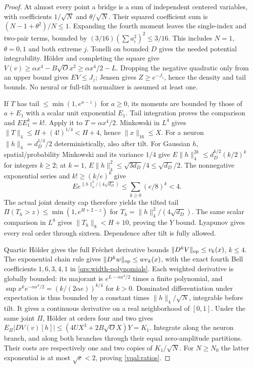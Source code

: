 \documentclass[11pt]{article}
\theoremstyle{plain}
\theoremstyle{definition}
\theoremstyle{remark}
\begin{document}
\begin{proof}
At almost every point a bridge is a sum of independent centered
variables, with coefficients $1/\sqrt N$ and $\theta/\sqrt N$.
Their squared coefficient sum is $(N-1+\theta^2)/N\le1$.
Expanding the fourth moment leaves the single-index and two-pair terms,
bounded by $(3/16)(\sum a_i^2)^2\le3/16$. This includes $N=1$,
$\theta=0,1$ and both extreme $j$. Tonelli on bounded $D$ gives the
needed potential integrability. H\"older and completing the square give
$V(v)\ge\alpha x^4-B\sqrt O x^2\ge\alpha x^4/2-L$.
Dropping the negative quadratic only from an upper bound gives
$EV\le J_z$; Jensen gives $Z\ge e^{-J_z}$, hence the density and tail
bounds. No neural or full-tilt normalizer is assumed at least one.

If $T$ has tail $\le\min(1,e^{a-z})$ for $a\ge0$, its moments are
bounded by those of $a+E_1$ with a scalar unit exponential $E_1$.
Tail integration proves the comparison and $EE_1^k=k!$.
Apply it to $T=\alpha x^4/2$. Minkowski in $L^4$ gives
$\|T\|_4\le H+(4!)^{1/4}<H+4$, hence $\|x\|_{16}\le X$.
For a neuron $\|h\|_4=d_D^{1/4}/2$ deterministically, also after tilt.
For Gaussian $h$, spatial/probability Minkowski and its variance $1/4$
give $E\|h\|_4^{2k}\le d_D^{k/2}(k/2)^k$ for integers $k\ge2$;
at $k=1$, $E\|h\|_4^2\le\sqrt{3d_D}/4\le\sqrt{d_D}/2$.
The nonnegative exponential series and $k!\ge(k/e)^k$ give
\begin{equation}\label{vqal:gaussianexp}
 E e^{\|h\|_4^2/(4\sqrt{d_D})}
 \le\sum_{k\ge0}(e/8)^k<4.
\end{equation}
The actual joint density cap therefore yields the tilted tail
$\Pi(T_h>z)\le\min(1,e^{H+2-z})$ for
$T_h=\|h\|_4^2/(4\sqrt{d_D})$.
The same scalar comparison in $L^8$ gives
$\|T_h\|_8<H+10$, proving the $Y$ bound. Lyapunov gives every real
order through sixteen. Dependence after tilt is fully allowed.

Quartic H\"older gives the full Fr\'echet derivative bounds
$\|D^kV\|_{\rm op}\le v_k(x)$, $k\le4$.
The exponential chain rule gives $\|D^kw\|_{\rm op}\le w e_k(x)$,
with the exact fourth Bell coefficients $1,6,3,4,1$ in
\eqref{qrs:width-polynomials}. Each weighted derivative is globally
bounded: its majorant is $e^{L-\alpha x^4/2}$ times a finite polynomial,
and $\sup x^ke^{-\alpha x^4/2}=(k/(2\alpha e))^{k/4}$ for $k>0$.
Dominated differentiation under expectation is thus bounded by a
constant times $\|h\|_4/\sqrt N$, integrable before tilt.
It gives a continuous derivative on a real neighborhood of $[0,1]$.
Under the same joint $\Pi$, H\"older at orders four and two gives
$E_\Pi|DV(v)[h]|\le(4UX^3+2B\sqrt O X)Y=K_1$.
Integrate along the neuron branch, and along both branches through their
equal zero-amplitude partitions. Their costs are respectively one and
two copies of $K_1/\sqrt N$. For $N\ge N_0$ the latter exponential is
at most $\sqrt e<2$, proving \eqref{vqal:ratios}.


\end{proof}
\end{document}
